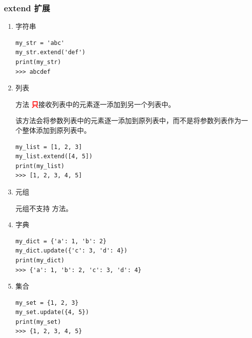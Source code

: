 \subsubsection{extend 扩展}
\begin{enumerate}[label=\arabic*)]
    \item 字符串

\begin{lstlisting}[style=demostyle,numbers=none]
my_str = 'abc'
my_str.extend('def')
print(my_str)  
>>> abcdef
\end{lstlisting}

    \item 列表

    方法 \textcolor{red}{\textbf{只}}接收列表中的元素逐一添加到另一个列表中。

    该方法会将参数列表中的元素逐一添加到原列表中，而不是将参数列表作为一个整体添加到原列表中。
\begin{lstlisting}[style=demostyle,numbers=none]
my_list = [1, 2, 3]
my_list.extend([4, 5])
print(my_list)  
>>> [1, 2, 3, 4, 5]
\end{lstlisting}

    \item 元组

    元组不支持  方法。

    \item 字典
\begin{lstlisting}[style=demostyle,numbers=none]
my_dict = {'a': 1, 'b': 2}
my_dict.update({'c': 3, 'd': 4})
print(my_dict)  
>>> {'a': 1, 'b': 2, 'c': 3, 'd': 4}
\end{lstlisting}

    \item 集合
\begin{lstlisting}[style=demostyle,numbers=none]
my_set = {1, 2, 3}
my_set.update({4, 5})
print(my_set)  
>>> {1, 2, 3, 4, 5}
\end{lstlisting}
\end{enumerate}

